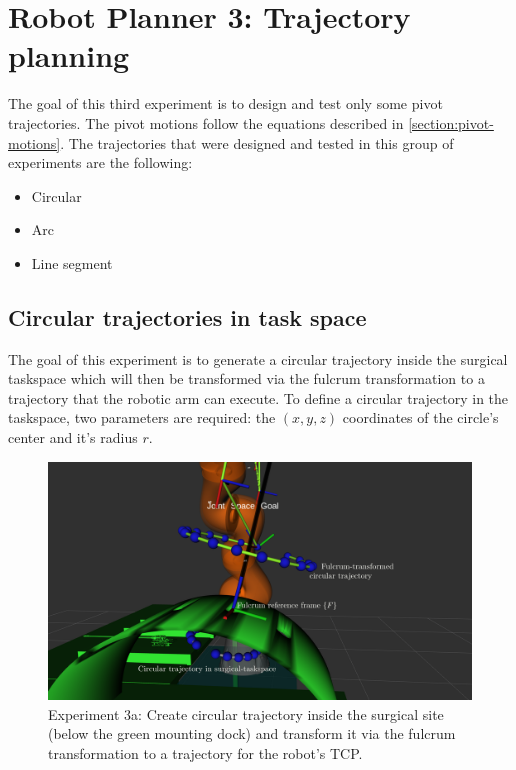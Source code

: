 \section{Robot Planner 3: Trajectory planning}

The goal of this third experiment is to design and test only some pivot trajectories. The pivot motions follow the equations described in 
\ref{section:pivot-motions}. The trajectories that were designed and tested in this group of experiments are the following:
\begin{itemize}
\item Circular
\item Arc
\item Line segment
\end{itemize}

\subsection{Circular trajectories in task space}

The goal of this experiment is to generate a circular trajectory inside the surgical taskspace which will then be transformed via the fulcrum transformation 
to a trajectory that the robotic arm can execute. To define a circular trajectory in the taskspace, two parameters are required: the $(x,y,z)$ coordinates of the 
circle's center and it's radius $r$.\\ 

\begin{center}
\begin{figure}[!htb]
\centering
\includegraphics[width=\textwidth]{images/robot_planner3/3a_circle.png}
\caption{Experiment 3a: Create circular trajectory inside the surgical site (below the green mounting dock) and transform it via the fulcrum transformation to a trajectory for the robot's TCP.}
\label{robot-planner3a-circle}
\end{figure}
\end{center}

